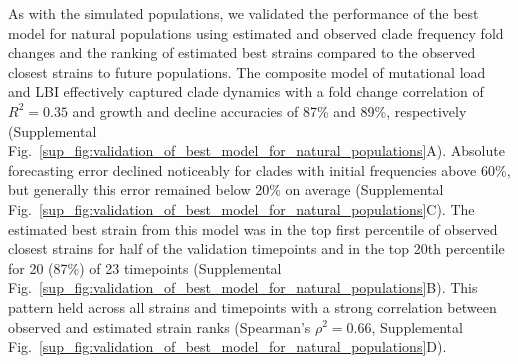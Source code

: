 As with the simulated populations, we validated the performance of the best model for natural populations using estimated and observed clade frequency fold changes and the ranking of estimated best strains compared to the observed closest strains to future populations.
The composite model of mutational load and LBI effectively captured clade dynamics with a fold change correlation of $R^2 = 0.35$ and growth and decline accuracies of 87\% and 89\%, respectively (Supplemental Fig.~\ref{sup_fig:validation_of_best_model_for_natural_populations}A).
Absolute forecasting error declined noticeably for clades with initial frequencies above 60\%, but generally this error remained below 20\% on average (Supplemental Fig.~\ref{sup_fig:validation_of_best_model_for_natural_populations}C).
The estimated best strain from this model was in the top first percentile of observed closest strains for half of the validation timepoints and in the top 20th percentile for 20 (87\%) of 23 timepoints (Supplemental Fig.~\ref{sup_fig:validation_of_best_model_for_natural_populations}B).
This pattern held across all strains and timepoints with a strong correlation between observed and estimated strain ranks (Spearman's $\rho^2 = 0.66$, Supplemental Fig.~\ref{sup_fig:validation_of_best_model_for_natural_populations}D).

